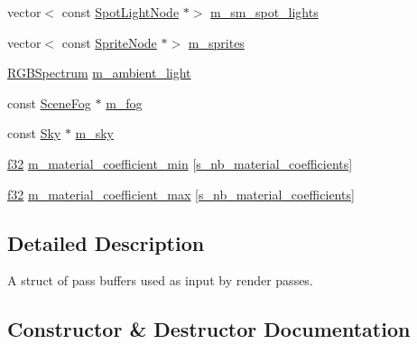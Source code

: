 \begin{DoxyCompactItemize}
\item 
vector$<$ const \hyperlink{namespacemage_aeed5dee4ff6c591eabb0e9114256df4a}{Spot\+Light\+Node} $\ast$$>$ \hyperlink{structmage_1_1_pass_buffer_aa28fb6d14ea463f82f35117e8dfa23fc}{m\+\_\+sm\+\_\+spot\+\_\+lights}
\item 
vector$<$ const \hyperlink{classmage_1_1_sprite_node}{Sprite\+Node} $\ast$$>$ \hyperlink{structmage_1_1_pass_buffer_ad742ad6712a63e9d58621da83a7fb900}{m\+\_\+sprites}
\item 
\hyperlink{structmage_1_1_r_g_b_spectrum}{R\+G\+B\+Spectrum} \hyperlink{structmage_1_1_pass_buffer_a311ad723470aff0ad80c325d9ead07b9}{m\+\_\+ambient\+\_\+light}
\item 
const \hyperlink{structmage_1_1_scene_fog}{Scene\+Fog} $\ast$ \hyperlink{structmage_1_1_pass_buffer_a3691cc52fe3bc5f1c86bf0dad36061d8}{m\+\_\+fog}
\item 
const \hyperlink{structmage_1_1_sky}{Sky} $\ast$ \hyperlink{structmage_1_1_pass_buffer_a19d0163dbfe7e60c664fdf433d47146b}{m\+\_\+sky}
\item 
\hyperlink{namespacemage_a6a44ad388483959dc4dff9f2aef91431}{f32} \hyperlink{structmage_1_1_pass_buffer_a35ef8d7b14bf3088813d72de732b149e}{m\+\_\+material\+\_\+coefficient\+\_\+min} \mbox{[}\hyperlink{structmage_1_1_pass_buffer_a453e18abdf29c4ebb08d9e002a952bf2}{s\+\_\+nb\+\_\+material\+\_\+coefficients}\mbox{]}
\item 
\hyperlink{namespacemage_a6a44ad388483959dc4dff9f2aef91431}{f32} \hyperlink{structmage_1_1_pass_buffer_a3e054213536045024e46037fb926d39c}{m\+\_\+material\+\_\+coefficient\+\_\+max} \mbox{[}\hyperlink{structmage_1_1_pass_buffer_a453e18abdf29c4ebb08d9e002a952bf2}{s\+\_\+nb\+\_\+material\+\_\+coefficients}\mbox{]}
\end{DoxyCompactItemize}


\subsection{Detailed Description}
A struct of pass buffers used as input by render passes. 

\subsection{Constructor \& Destructor Documentation}
\hypertarget{structmage_1_1_pass_buffer_a02e07a26327f6e57b193521636bb8e10}{}\label{structmage_1_1_pass_buffer_a02e07a26327f6e57b193521636bb8e10} 
